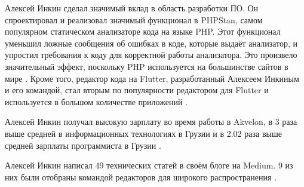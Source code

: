 Алексей Инкин сделал значимый вклад в область разработки ПО.
Он спроектировал и реализовал значимый функционал в PHPStan, самом популярном статическом анализаторе
кода на языке PHP.
Этот функционал уменьшил ложные сообщения об ошибках в коде, которые выдаёт анализатор,
и упростил требования к коду для корректной работы анализатора.
Это произвело значительный эффект, поскольку PHP используется на большинстве сайтов в мире .
Кроме того, редактор кода на Flutter, разработанный Алексеем Инкиным и его командой,
стал вторым по популярности редактором для Flutter и используется в большом количестве приложений
.

Алексей Инкин получал высокую зарплату во время работы в Akvelon,
в 3 раза выше средней в информационных технологиях в Грузии
и в 2.02 раза выше средней зарплаты программиста в Грузии .

Алексей Инкин написал 49 технических статей в своём блоге на Medium.
9 из них были отобраны командой редакторов для широкого распространения .

\pagebreak
